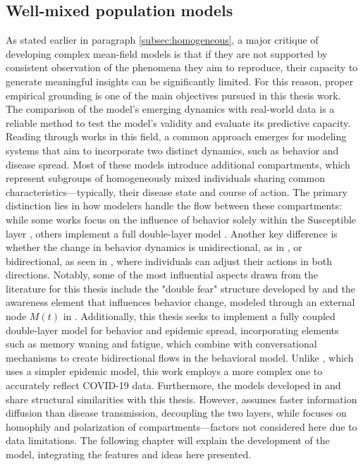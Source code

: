\subsection{Well-mixed population models}
As stated earlier in paragraph \ref{subsec:homogeneous}, a major critique of developing complex mean-field models is that if they are not supported by consistent observation of the phenomena they aim to reproduce, their capacity to generate meaningful insights can be significantly limited. For this reason, proper empirical grounding is one of the main objectives pursued in this thesis work. The comparison of the model's emerging dynamics with real-world data is a reliable method to test the model's validity and evaluate its predictive capacity.
Reading through works in this field, a common approach emerges for modeling systems that aim to incorporate two distinct dynamics, such as behavior and disease spread. Most of these models introduce additional compartments, which represent subgroups of homogeneously mixed individuals sharing common characteristics—typically, their disease state and course of action. The primary distinction lies in how modelers handle the flow between these compartments: while some works focus on the influence of behavior solely within the Susceptible layer \cite{Epstein_2021, Tyson_2020, Zuo2022}, others implement a full double-layer model \cite{Bongarti2023, Bulai2023, Tanaka_2002}. Another key difference is whether the change in behavior dynamics is unidirectional, as in \cite{Bongarti2023}, or bidirectional, as seen in \cite{Epstein_2021, Tyson_2020, Tanaka_2002, Zuo2022}, where individuals can adjust their actions in both directions.
Notably, some of the most influential aspects drawn from the literature for this thesis include the "double fear" structure developed by \cite{Epstein_2021} and the awareness element that influences behavior change, modeled through an external node $M(t)$ in \cite{Zuo2022}. Additionally, this thesis seeks to implement a fully coupled double-layer model for behavior and epidemic spread, incorporating elements such as memory waning and fatigue, which combine with conversational mechanisms to create bidirectional flows in the behavioral model.
Unlike \cite{Tanaka_2002}, which uses a simpler epidemic model, this work employs a more complex one to accurately reflect COVID-19 data. Furthermore, the models developed in \cite{Bulai2023} and \cite{Smaldino_2021} share structural similarities with this thesis. However, \cite{Bulai2023} assumes faster information diffusion than disease transmission, decoupling the two layers, while \cite{Smaldino_2021} focuses on homophily and polarization of compartments—factors not considered here due to data limitations.
The following chapter will explain the development of the model, integrating the features and ideas here presented.

